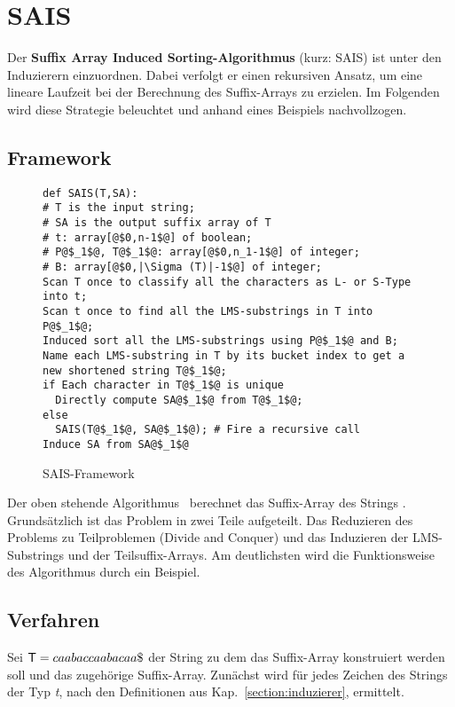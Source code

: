 \section{SAIS}
\label{section:sais}


Der \textbf{Suffix Array Induced Sorting-Algorithmus}\cite[Kap.~3]{saca:6} (kurz: SAIS) ist unter den Induzierern einzuordnen. Dabei verfolgt er einen rekursiven Ansatz, um eine lineare Laufzeit bei der Berechnung des Suffix-Arrays zu erzielen. Im Folgenden wird diese Strategie beleuchtet und anhand eines Beispiels nachvollzogen.

\subsection{Framework}
\label{saisAlg}


\begin{figure}[h]
\begin{verbatim}
def SAIS(T,SA):
# T is the input string;
# SA is the output suffix array of T
# t: array[@$0,n-1$@] of boolean;
# P@$_1$@, T@$_1$@: array[@$0,n_1-1$@] of integer;
# B: array[@$0,|\Sigma (T)|-1$@] of integer;
Scan T once to classify all the characters as L- or S-Type into t;
Scan t once to find all the LMS-substrings in T into P@$_1$@;
Induced sort all the LMS-substrings using P@$_1$@ and B;
Name each LMS-substring in T by its bucket index to get a new shortened string T@$_1$@;
if Each character in T@$_1$@ is unique
  Directly compute SA@$_1$@ from T@$_1$@;
else
  SAIS(T@$_1$@, SA@$_1$@); # Fire a recursive call
Induce SA from SA@$_1$@ 
\end{verbatim}
\caption{SAIS-Framework}
\end{figure}


\noindent Der oben stehende Algorithmus~\cite[Fig.~1]{saca:6} berechnet das Suffix-Array des Strings  . Grundsätzlich ist das Problem in zwei Teile aufgeteilt. Das Reduzieren des Problems zu Teilproblemen (Divide and Conquer) und das Induzieren der LMS-Substrings und der Teilsuffix-Arrays. Am deutlichsten wird die Funktionsweise des Algorithmus durch ein Beispiel.

\subsection{Verfahren}
Sei $\inputtext = caabaccaabacaa\$$ der String zu dem das Suffix-Array konstruiert werden soll und \sa das zugehörige Suffix-Array. Zunächst wird für jedes Zeichen des Strings  der Typ \textit{t}, nach den Definitionen aus Kap.~\ref{section:induzierer}, ermittelt.

